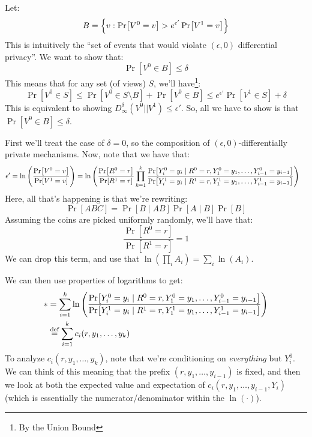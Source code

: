 \documentclass{article}
\theoremstyle{definition}
\begin{document}
Let:
\begin{equation}
B = \Bqty{v : \Pr[V^0 = v] > e^{\epsilon'} \Pr[V^1 = v]}
\end{equation}
This is intuitively the ``set of events that would violate $(\epsilon,0)$ differential privacy''.
We want to show that:
\begin{equation}
\Pr[V^0\in B]\leq \delta
\end{equation}
This means that for any set (of views) $S$, we'll have\footnote{By the Union Bound}:
\begin{equation}
\Pr[V^0\in S] \leq \Pr[V^0\in S\setminus B]+\Pr[V^0\in B]\leq e^{\epsilon'}\Pr[V^1\in S]+ \delta
\end{equation}
This is equivalent to showing $D_\infty^\delta(V^0||V^1)\leq\epsilon'$.
So, all we have to show is that $\Pr[V^0\in B]\leq \delta$.

First we'll treat the case of $\delta = 0$, so the composition of $(\epsilon,0)$-differentially private mechanisms.
Now, note that we have that:
\begin{align*}
\epsilon' = \ln\pqty{\frac{\Pr[V^0 = v]}{\Pr[V^1 = v]}} & = \ln\pqty{\frac{\Pr[R^0 = r]}{\Pr[R^1 = r]}\prod_{k = 1}^k\frac{\Pr[Y_i^0 = y_i\mid R^0 = r,Y_1^0 = y_1,\dots,Y_{i-1}^0 = y_{i-1}]}{\Pr[Y_i^1 = y_i\mid R^1 = r,Y_1^1 = y_1,\dots,Y_{i-1}^1 = y_{i-1}]}}
\end{align*}
Here, all that's happening is that we're rewriting:
\begin{equation}
\Pr[ABC] = \Pr[B\mid AB]\Pr[A\mid B]\Pr[B]
\end{equation}
Assuming the coins are picked uniformly randomly, we'll have that:
\begin{equation}
\frac{\Pr[R^0 = r]}{\Pr[R^1 = r]} = 1
\end{equation}
We can drop this term, and use that $\ln(\prod_i A_i) = \sum_i \ln(A_i)$.

We can then use properties of logarithms to get:
\begin{align*}
\ast &= \sum_{i = 1}^k \ln\pqty{\frac{\Pr[Y_i^0 = y_i\mid R^0 = r,Y_1^0 = y_1,\dots,Y_{i-1}^0 = y_{i-1}]}{\Pr[Y_i^1 = y_i\mid R^1 = r,Y_1^1 = y_1,\dots,Y_{i-1}^1 = y_{i-1}]}} \\
&\overset{\text{def}}{=}\sum_{i = 1}^k c_i(r,y_1,\dots,y_k)
\end{align*}
To analyze $c_i(r,y_1,\dots,y_k)$, note that we're conditioning on \emph{everything} but $Y_{i}^0$.
We can think of this meaning that the prefix $(r,y_1,\dots,y_{i-1})$ is fixed, and then we look at both the expected value and expectation of $c_i(r,y_1,\dots,y_{i-1},Y_i)$ (which is essentially the numerator/denominator within the $\ln(\cdot)$).
\end{document}
